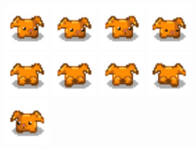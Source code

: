 \documentclass{article}
\begin{document}
\begin{figure}[h]
    \includegraphics[height = 2cm]{haricot/idle_0.png}
    \includegraphics[height = 2cm]{haricot/idle_1.png}
    \includegraphics[height = 2cm]{haricot/idle_2.png}
    \includegraphics[height = 2cm]{haricot/idle_3.png}
    \\
    \includegraphics[height = 2cm]{haricot/back_0.png}
    \includegraphics[height = 2cm]{haricot/back_1.png}
    \includegraphics[height = 2cm]{haricot/back_2.png}
    \includegraphics[height = 2cm]{haricot/back_3.png}
    \\
    \includegraphics[height = 2cm]{haricot/left_0.png}

\end{figure}
\end{document}
